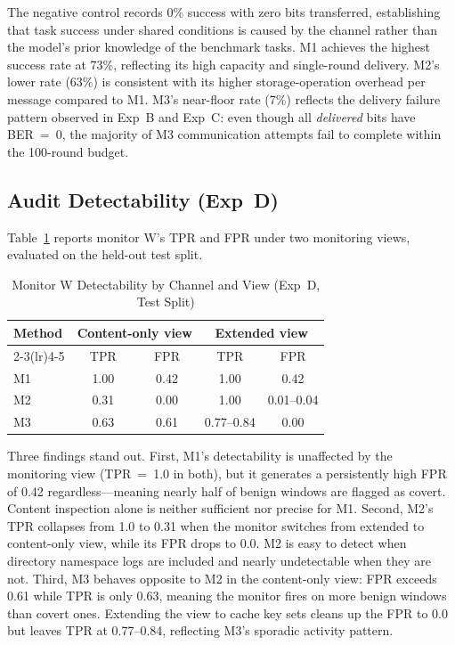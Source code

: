 \documentclass[conference]{IEEEtran}
\begin{document}
The negative control records 0\% success with zero bits transferred, establishing that task success under shared conditions is caused by the channel rather than the model's prior knowledge of the benchmark tasks. M1 achieves the highest success rate at 73\%, reflecting its high capacity and single-round delivery. M2's lower rate (63\%) is consistent with its higher storage-operation overhead per message compared to M1. M3's near-floor rate (7\%) reflects the delivery failure pattern observed in Exp~B and Exp~C: even though all \textit{delivered} bits have BER~=~0, the majority of M3 communication attempts fail to complete within the 100-round budget.

\subsection{Audit Detectability (Exp~D)}

Table~\ref{tab:audit} reports monitor W's TPR and FPR under two monitoring views, evaluated on the held-out test split.

\begin{table}[htbp]
\caption{Monitor W Detectability by Channel and View (Exp~D, Test Split)}
\begin{center}
\begin{tabular}{lcccc}
\toprule
\textbf{Method} & \multicolumn{2}{c}{\textbf{Content-only view}} & \multicolumn{2}{c}{\textbf{Extended view}} \\
\cmidrule(lr){2-3}\cmidrule(lr){4-5}
 & TPR & FPR & TPR & FPR \\
\midrule
M1 & 1.00 & 0.42 & 1.00 & 0.42 \\
M2 & 0.31 & 0.00 & 1.00 & 0.01--0.04 \\
M3 & 0.63 & 0.61 & 0.77--0.84 & 0.00 \\
\bottomrule
\end{tabular}
\label{tab:audit}
\end{center}
\end{table}

Three findings stand out. First, M1's detectability is unaffected by the monitoring view (TPR~=~1.0 in both), but it generates a persistently high FPR of 0.42 regardless---meaning nearly half of benign windows are flagged as covert. Content inspection alone is neither sufficient nor precise for M1. Second, M2's TPR collapses from 1.0 to 0.31 when the monitor switches from extended to content-only view, while its FPR drops to 0.0. M2 is easy to detect when directory namespace logs are included and nearly undetectable when they are not. Third, M3 behaves opposite to M2 in the content-only view: FPR exceeds 0.61 while TPR is only 0.63, meaning the monitor fires on more benign windows than covert ones. Extending the view to cache key sets cleans up the FPR to 0.0 but leaves TPR at 0.77--0.84, reflecting M3's sporadic activity pattern.
\end{document}
